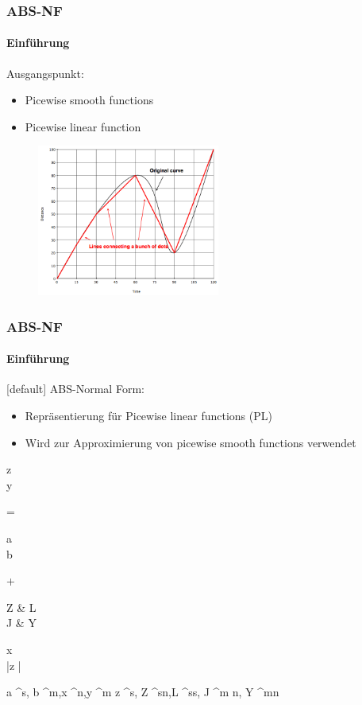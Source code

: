 \begin{frame}
	\frametitle{ABS-NF}
	\framesubtitle{Einführung}
	Ausgangspunkt:
	\begin{itemize}
		\item Picewise smooth functions
		\item Picewise linear function
	\end{itemize}
	\pause
	\begin{figure}[h]
		\includegraphics[width=6cm]{img/function}
	\end{figure}
\end{frame}
\begin{frame}
	\frametitle{ABS-NF}
	\framesubtitle{Einführung}
	[default]
	ABS-Normal Form:
	\begin{itemize}
		\item Repräsentierung für Picewise linear functions (PL)
		\item Wird zur Approximierung von picewise smooth functions verwendet
	\end{itemize}
	\begin{flalign*}
	\begin{pmatrix}
	\Delta z \\
	\Delta y
	\end{pmatrix}
	= 
	\begin{pmatrix}
	a \\
	b
	\end{pmatrix}
	+
	\begin{pmatrix}
	Z & L \\
	J & Y 
	\end{pmatrix}
	\times
	\begin{pmatrix}
	\Delta x \\
	|\Delta z |
	\end{pmatrix}
	\end{flalign*}
	\begin{flalign*}
	a \in {}^s, b \in {}^m,\Delta x \in {}^n,\Delta y \in {}^m \Delta z \in {}^s, Z \in {}^{s\times n},L \in {}^{s\times s}, J \in {}^{m \times n}, Y \in {}^{m\times n}
	\end{flalign*}
\end{frame}
